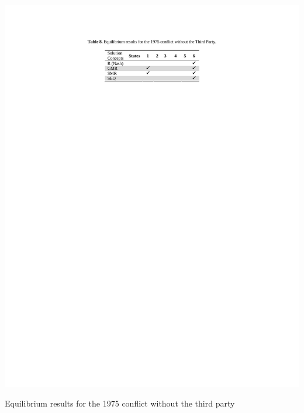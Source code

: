 \documentclass[letterpaper,12pt,titlepage,oneside,final]{book}
\begin{document}
\begin{table}[H]
\centering
\includegraphics[scale=1]{PDF-IMG/tables/8.pdf}

\caption{Equilibrium results for the 1975 conflict without the third party}

\label{tbl:t8}
\end{table}
\end{document}
